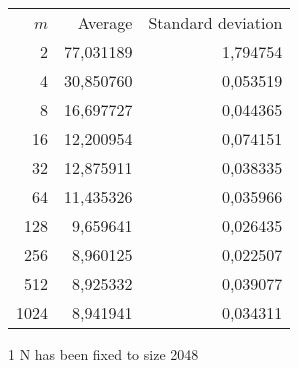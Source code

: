 \begin{tabular}{rrr}\
 $m$ & Average & Standard deviation  \\
2 &  77,031189 &  1,794754 \\ 
4 &  30,850760 &  0,053519 \\ 
8 &  16,697727 &  0,044365 \\ 
16 &  12,200954 &  0,074151 \\ 
32 &  12,875911 &  0,038335 \\ 
64 &  11,435326 &  0,035966 \\ 
128 &  9,659641 &  0,026435 \\ 
256 &  8,960125 &  0,022507 \\ 
512 &  8,925332 &  0,039077 \\ 
1024 &  8,941941 &  0,034311 \\ 
\end{tabular}
\begin{tablenotes}
\item[1] N has been fixed to size 2048
\end{tablenotes}
